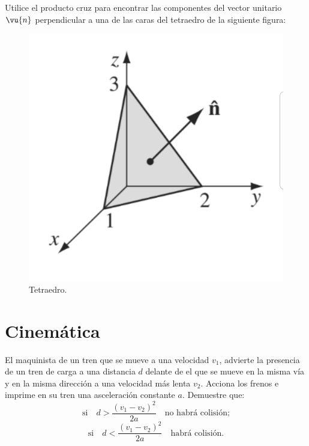 \begin{ejercicio}
	Utilice el producto cruz para encontrar las componentes del vector unitario $\vu{n}$ perpendicular a una de las caras del tetraedro de la siguiente figura:
	\begin{figure}[H]
		\centering
		\includegraphics[scale=0.07]{./img/tetraedro.jpeg}
		\caption{Tetraedro.}
		\label{tetraedro}
	\end{figure}
\end{ejercicio}


\section*{Cinemática}


\begin{ejercicio}
	El maquinista de un tren que se mueve a una velocidad $v_1$, advierte la presencia de un tren de carga a una distancia $d$ delante de el que se mueve en la misma vía y en la misma dirección a una velocidad más lenta $v_2$. Acciona los frenos e imprime en su tren una asceleración constante $a$. Demuestre que:
			$$ \text{si} \quad d > \frac{(v_1 - v_2)^2}{2a} \quad \text{no habrá colisión;} $$
			$$ \text{si} \quad d < \frac{(v_1 - v_2)^2}{2a} \quad \text{habrá colisión.} $$
\end{ejercicio}



